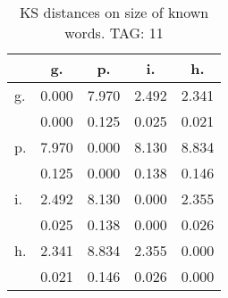 \begin{table}[h!]
\begin{center}
\begin{tabular}{| l | c | c | c | c |}\hline
 & g. & p. & i. & h. \\\hline
g. & 0.000  & 7.970  & 2.492  & 2.341 \\\hline
 & 0.000  & 0.125  & 0.025  & 0.021 \\\hline
p. & 7.970  & 0.000  & 8.130  & 8.834 \\\hline
 & 0.125  & 0.000  & 0.138  & 0.146 \\\hline
i. & 2.492  & 8.130  & 0.000  & 2.355 \\\hline
 & 0.025  & 0.138  & 0.000  & 0.026 \\\hline
h. & 2.341  & 8.834  & 2.355  & 0.000 \\\hline
 & 0.021  & 0.146  & 0.026  & 0.000 \\\hline
\end{tabular}
\caption{KS distances on size of known words. TAG: 11}
\end{center}
\end{table}